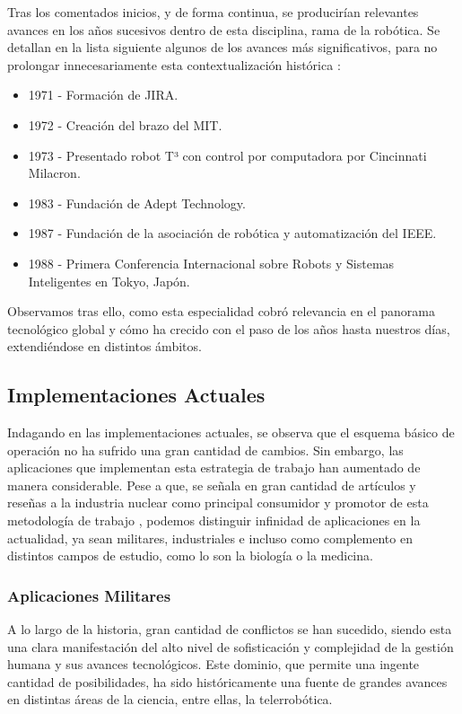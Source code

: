 Tras los comentados inicios, y de forma continua, se producirían relevantes avances en los años sucesivos dentro de esta disciplina, rama de la robótica. Se detallan en la lista siguiente algunos de los avances más significativos, para no prolongar innecesariamente esta contextualización histórica \cite{7}:

\begin{itemize}
    \item 1971 - Formación de JIRA.
    \item 1972 - Creación del brazo del MIT.
    \item 1973 - Presentado robot  T³ con control por computadora por  Cincinnati Milacron.
    \item 1983 - Fundación de Adept Technology.
    \item 1987 - Fundación de la asociación de robótica y automatización del IEEE.
    \item 1988 - Primera Conferencia Internacional sobre Robots y Sistemas Inteligentes en Tokyo, Japón.
\end{itemize}

Observamos tras ello, como esta especialidad cobró relevancia en el panorama tecnológico global y cómo ha crecido con el paso de los años hasta nuestros días, extendiéndose en distintos ámbitos. 

\subsection{Implementaciones Actuales}
Indagando en las implementaciones actuales, se observa que el esquema básico de operación no ha sufrido una  gran cantidad de cambios. Sin embargo, las aplicaciones que implementan esta estrategia de trabajo han aumentado de manera considerable. Pese a que, se señala en gran cantidad de artículos y reseñas a la industria nuclear como principal consumidor y promotor de esta metodología de trabajo \cite{8}, podemos distinguir infinidad de aplicaciones en la actualidad, ya sean militares, industriales e incluso como complemento en distintos campos de estudio, como lo son la biología o la medicina.

\subsubsection{Aplicaciones Militares}
 A lo largo de la historia, gran cantidad de conflictos se han sucedido, siendo esta una  clara manifestación del alto nivel de sofisticación y complejidad de la gestión humana y sus avances tecnológicos. Este dominio, que permite una ingente cantidad de posibilidades, ha sido históricamente una fuente de grandes avances en distintas áreas de la ciencia, entre ellas, la telerrobótica.  

